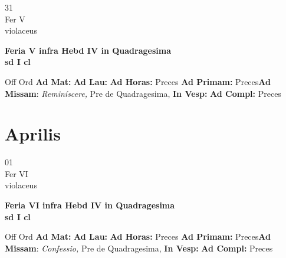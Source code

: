 \documentclass[10pt, openany]{book}
\begin{document}
    \begin{center}
        \begin{minipage}{3.5in}
            \vspace{2em}
            \begin{minipage}{0.5in}
                {\Huge 31} \\
                {\normalsize Fer V} \\
                {\normalsize violaceus}
            \end{minipage}
            \begin{minipage}{3.0in}
                \textbf{ \large Feria V infra Hebd IV in Quadragesima  \\
                \textnormal{\normalsize sd I cl}} \\ 
            \end{minipage}
            \begin{justify}Off Ord
                \textbf{Ad Mat: }
                \textbf{Ad Lau: }
                \textbf{Ad Horas: }Preces
                \textbf{Ad Primam: }Preces\textbf{Ad Missam}: \textit{Reminíscere,} Pre de Quadragesima,  
                \textbf{In Vesp: }
                \textbf{Ad Compl: }Preces
            \end{justify}
        \end{minipage}
    \end{center}

    \chapter{Aprilis}
                    
    \begin{center}
        \begin{minipage}{3.5in}
            \vspace{2em}
            \begin{minipage}{0.5in}
                {\Huge 01} \\
                {\normalsize Fer VI} \\
                {\normalsize violaceus}
            \end{minipage}
            \begin{minipage}{3.0in}
                \textbf{ \large Feria VI infra Hebd IV in Quadragesima  \\
                \textnormal{\normalsize sd I cl}} \\ 
            \end{minipage}
            \begin{justify}Off Ord
                \textbf{Ad Mat: }
                \textbf{Ad Lau: }
                \textbf{Ad Horas: }Preces
                \textbf{Ad Primam: }Preces\textbf{Ad Missam}: \textit{Confessio,} Pre de Quadragesima,  
                \textbf{In Vesp: }
                \textbf{Ad Compl: }Preces
            \end{justify}
        \end{minipage}
    \end{center}
\end{document}
